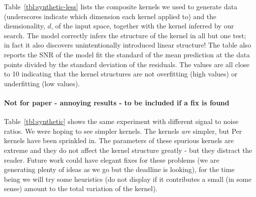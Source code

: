 \documentclass[twoside]{article}
\begin{document}
Table~\ref{tbl:synthetic-less} lists the composite kernels we used to generate data (underscores indicate which dimension each kernel applied to) and the diemsionality, $d$, of the input space, together with the kernel inferred by our search.
The model correctly infers the structure of the kernel in all but one test; in fact it also discovers unintentionally introduced linear structure\footnotemark!
The table also reports the SNR of the model fit \ie the standard of the mean prediction at the data points divided by the standard deviation of the residuals.
The values are all close to 10 indicating that the kernel structures are not overfitting (high values) or underfitting (low values).


\paragraph{Not for paper - annoying results - to be included if a fix is found}

Table~\ref{tbl:synthetic} shows the same experiment with different signal to noise ratios.
We were hoping to see simpler kernels.
The kernels \emph{are} simpler, but Per kernels have been sprinkled in.
The parameters of these spurious kernels are extreme and they do not affect the kernel structure greatly - but they distract the reader.
Future work could have elegant fixes for these problems (we are generating plenty of ideas as we go but the deadline is looking), for the time being we will try some heuristics (\eg do not display if it contributes a small (in some sense) amount to the total variation of the kernel).
\end{document}

